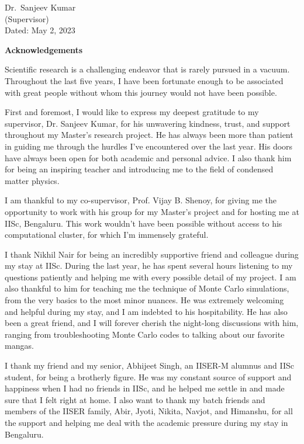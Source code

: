 \documentclass[a4paper,12pt]{report}
\numberwithin{equation}{section}
\begin{document}
\begin{flushright}
Dr.~Sanjeev Kumar
\\
(Supervisor)
\\
Dated: May 2, 2023
\end{flushright}

\cleardoublepage

\newpage
\thispagestyle{empty}
\mbox{}
\newpage

\begin{center}
\textsf{\textbf{\Large Acknowledgements}} 
\end{center}
\vspace*{1em}

Scientific research is a challenging endeavor that is rarely pursued in a vacuum. Throughout the last five years, I have been fortunate enough to be associated with great people without whom this journey would not have been possible.

First and foremost, I would like to express my deepest gratitude to my supervisor, Dr. Sanjeev Kumar, for his unwavering kindness, trust, and support throughout my Master's research project. He has always been more than patient in guiding me through the hurdles I've encountered over the last year. His doors have always been open for both academic and personal advice. I also thank him for being an inspiring teacher and introducing me to the field of condensed matter physics.

I am thankful to my co-supervisor, Prof. Vijay B. Shenoy, for giving me the opportunity to work with his group for my Master's project and for hosting me at IISc, Bengaluru. This work wouldn't have been possible without access to his computational cluster, for which I'm immensely grateful. 

I thank Nikhil Nair for being an incredibly supportive friend and colleague during my stay at IISc. During the last year, he has spent several hours listening to my questions patiently and helping me with every possible detail of my project. I am also thankful to him for teaching me the technique of Monte Carlo simulations, from the very basics to the most minor nuances. He was extremely welcoming and helpful during my stay, and I am indebted to his hospitability. He has also been a great friend, and I will forever cherish the night-long discussions with him, ranging from troubleshooting Monte Carlo codes to talking about our favorite mangas. 

I thank my friend and my senior, Abhijeet Singh, an IISER-M alumnus and IISc student, for being a brotherly figure. He was my constant source of support and happiness when I had no friends in IISc, and he helped me settle in and made sure that I felt right at home. I also want to thank my batch friends and members of the IISER family, Abir, Jyoti, Nikita, Navjot, and Himanshu, for all the support and helping me deal with the academic pressure during my stay in Bengaluru.
\end{document}
